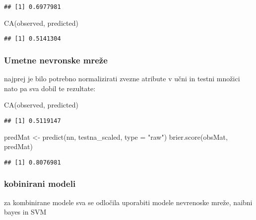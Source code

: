 \documentclass[
]{article}
\newenvironment{Shaded}{\begin{snugshade}}{\end{snugshade}}
\newcommand{\AttributeTok}[1]{\textcolor[rgb]{0.77,0.63,0.00}{#1}}
\newcommand{\FunctionTok}[1]{\textcolor[rgb]{0.00,0.00,0.00}{#1}}
\newcommand{\NormalTok}[1]{#1}
\newcommand{\OtherTok}[1]{\textcolor[rgb]{0.56,0.35,0.01}{#1}}
\newcommand{\StringTok}[1]{\textcolor[rgb]{0.31,0.60,0.02}{#1}}
\begin{document}
\begin{verbatim}
## [1] 0.6977981
\end{verbatim}

\begin{Shaded}
\begin{Highlighting}[]
\FunctionTok{CA}\NormalTok{(observed, predicted)}
\end{Highlighting}
\end{Shaded}

\begin{verbatim}
## [1] 0.5141304
\end{verbatim}

\hypertarget{umetne-nevronske-mreux17ee}{%
\subsubsection{Umetne nevronske
mreže}\label{umetne-nevronske-mreux17ee}}

najprej je bilo potrebno normalizirati zvezne atribute v učni in testni
množici nato pa sva dobil te rezultate:

\begin{Shaded}
\begin{Highlighting}[]
\FunctionTok{CA}\NormalTok{(observed, predicted)}
\end{Highlighting}
\end{Shaded}

\begin{verbatim}
## [1] 0.5119147
\end{verbatim}

\begin{Shaded}
\begin{Highlighting}[]
\NormalTok{predMat }\OtherTok{\textless{}{-}} \FunctionTok{predict}\NormalTok{(nn, testna\_scaled, }\AttributeTok{type =} \StringTok{"raw"}\NormalTok{)}
\FunctionTok{brier.score}\NormalTok{(obsMat, predMat)}
\end{Highlighting}
\end{Shaded}

\begin{verbatim}
## [1] 0.8076981
\end{verbatim}

\hypertarget{kobinirani-modeli}{%
\subsubsection{kobinirani modeli}\label{kobinirani-modeli}}

za kombinirane modele sva se odločila uporabiti modele nevrenoske mreže,
naibni bayes in SVM
\end{document}
